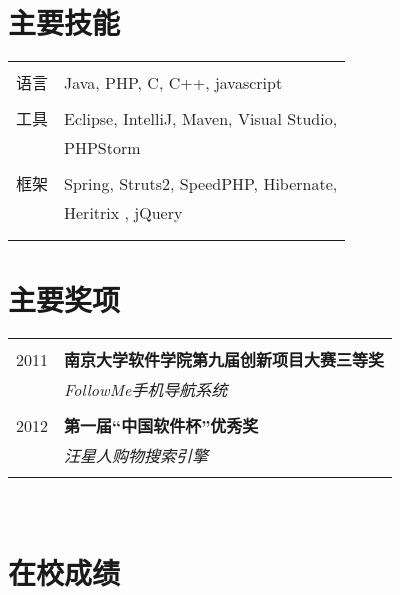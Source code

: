 \documentclass[10pt]{article} %
\begin{document}
{\begin{minipage}[t]{0.44\textwidth}
\section{主要技能} 

\begin{tabular}{rl}
& \\
语言
& Java, PHP, C, C++, javascript\\ 
& \\
工具
& Eclipse, IntelliJ, Maven, Visual Studio,\\
& PHPStorm\\
& \\
框架
& Spring, Struts2, SpeedPHP, Hibernate,\\
& Heritrix , jQuery\\
& \\ \\
\end{tabular}


\section{主要奖项} 

\begin{tabular}{rl}
& \\
2011	 & \textbf{南京大学软件学院第九届创新项目大赛三等奖}\\
& \textit{FollowMe手机导航系统}\\ \\


2012	 & \textbf{第一届“中国软件杯”优秀奖}\\
& \textit{汪星人购物搜索引擎}\\ 
& \\
\end{tabular}\\[10pt]



\section{在校成绩} 


\end{minipage}}
\end{document}
